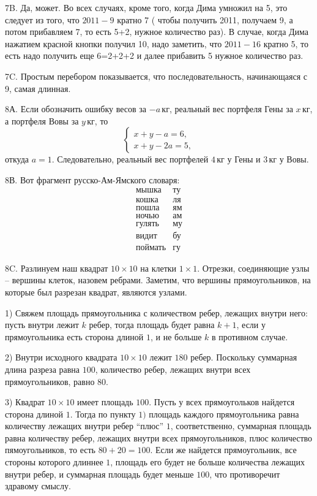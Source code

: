 \documentclass[12pt]{amsart}
\theoremstyle{definition}
\theoremstyle{remark}
\theoremstyle{plain}
\begin{document}
7B. Да, может. Во всех случаях, кроме того, когда Дима умножил на 5, это следует из того, что $2011-9$ кратно 7 ( чтобы получить 2011, получаем 9, а потом прибавляем 7, то есть 5+2, нужное количество раз). В случае, когда Дима нажатием красной кнопки получил 10, надо заметить, что $2011-16$ кратно 5, то есть надо получить еще 6=2+2+2 и далее прибавить 5 нужное количество раз.

7C. Простым перебором показывается, что последовательность, начинающаяся с 9, самая длинная.

8А. Если обозначить ошибку весов за $-a\,\text{кг}$, реальный вес портфеля Гены за $x\,\text{кг}$, а портфеля Вовы за $y\,\text{кг}$, то
$$
\begin{cases}
x+y-a=6,\\
x+y-2a=5,
\end{cases}
$$
откуда $a=1$. Следовательно, реальный вес портфелей $4\,\text{кг}$ у Гены и $3\,\text{кг}$ у Вовы.

8В. Вот фрагмент русско-Ам-Ямского словаря:
$$
\begin{array}{ll}
\text{мышка} & \text{ту}\\
\text{кошка} & \text{ля}\\
\text{пошла} & \text{ям}\\
\text{ночью} & \text{ам}\\
\text{гулять} & \text{му}\\
\text{видит} & \text{бу}\\
\text{поймать} & \text{гу}
\end{array}
$$

8C. Разлинуем наш квадрат $10\times 10$ на клетки $1\times 1$. Отрезки, соединяющие узлы -- вершины клеток, назовем ребрами. Заметим, что вершины прямоугольников, на которые был разрезан квадрат, являются узлами.

1) Свяжем площадь прямоугольника с количеством ребер, лежащих внутри него: пусть внутри лежит $k$ ребер, тогда площадь будет равна $k+1$, если у прямоугольника есть сторона длиной $1$, и не больше $k$ в противном случае.

2) Внутри исходного квадрата $10\times 10$ лежит $180$ ребер. Поскольку суммарная длина разреза равна $100$, количество ребер, лежащих внутри всех прямоугольников, равно $80$.

3) Квадрат $10\times 10$ имеет площадь $100$. Пусть у всех прямоугольков найдется сторона длиной $1$. Тогда по пункту $1)$ площадь каждого прямоугольника равна количеству лежащих внутри ребер "`плюс"' $1$, соответственно, суммарная площадь равна количеству ребер, лежащих внутри всех прямоугольников, плюс количество пямоугольников, то есть $80+20=100$. Если же найдется прямоугольник, все стороны которого длиннее $1$, площадь его будет не больше количества лежащих внутри ребер, и суммарная площадь будет меньше $100$, что противоречит здравому смыслу.
\end{document}
